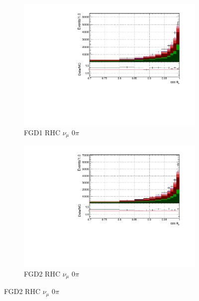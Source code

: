 \begin{figure}[!htbp]
\begin{subfigure}{0.49\textwidth}
  \centering
  \includegraphics[width=\textwidth]{figs/FGD1_NuMuBkg_CC0pi_in_AntiNu_Mode_t}
  \caption{FGD1 RHC $\nu_{\mu}$ 0$\pi$}
\end{subfigure}
\begin{subfigure}{0.49\textwidth}
  \centering
  \includegraphics[width=\textwidth]{figs/FGD2_NuMuBkg_CC0pi_in_AntiNu_Mode_t}
  \caption{FGD2 RHC $\nu_{\mu}$ 0$\pi$}
\end{subfigure}


\end{figure}

